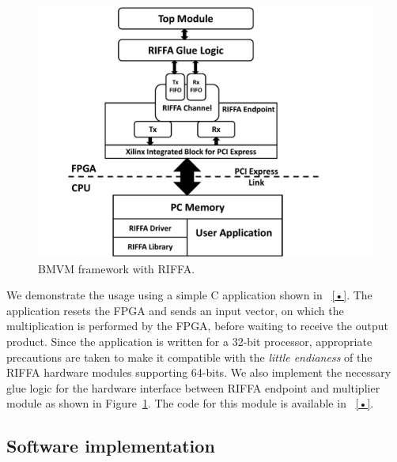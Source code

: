 \documentclass[conference, 9pt]{IEEEtran}
\begin{document}
\begin{figure}[t!]
\centering
\includegraphics[scale=0.35]{figs/riffa.pdf}
\caption{BMVM framework with RIFFA.}
\label{fig:riffa}
\end{figure}

We demonstrate the usage using a simple C application shown in ~\ref{•}. The application resets the FPGA and sends an input vector, on which the multiplication is performed by the FPGA, before waiting to receive the output product. Since the application is written for a 32-bit processor, appropriate precautions are taken to make it compatible with the \emph{little endianess} of the RIFFA hardware modules supporting 64-bits. We also implement the necessary glue logic for the hardware interface between RIFFA endpoint and multiplier module as shown in Figure~\ref{fig:riffa}. The code for this module is available in ~\ref{•}.\\  
      
\subsection{Software implementation}
\end{document}
